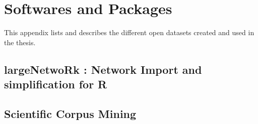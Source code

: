 \chapter{Softwares and Packages} %

\label{app:packages} %



\headercit{}{}{}



This appendix lists and describes the different open datasets created and used in the thesis.


\section{largeNetwoRk : Network Import and simplification for R}



\section{Scientific Corpus Mining}

